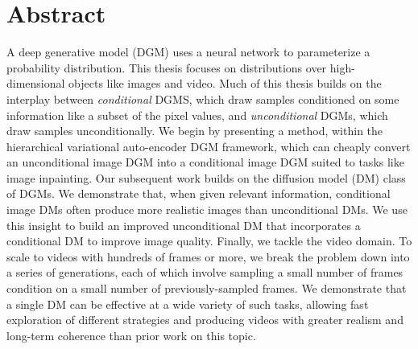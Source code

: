 
\chapter{Abstract}






A deep generative model (DGM) uses a neural network to parameterize a probability distribution. This thesis focuses on distributions over high-dimensional objects like images and video.
%
Much of this thesis builds on the interplay between \textit{conditional} DGMS, which draw samples conditioned on some information like a subset of the pixel values, and \textit{unconditional} DGMs, which draw samples unconditionally.
%
We begin by presenting a method, within the hierarchical variational auto-encoder DGM framework, which can cheaply convert an unconditional image DGM into a conditional image DGM suited to tasks like image inpainting. Our subsequent work builds on the diffusion model (DM) class of DGMs. We demonstrate that, when given relevant information, conditional image DMs often produce more realistic images than unconditional DMs. We use this insight to build an improved unconditional DM that incorporates a conditional DM to improve image quality. Finally, we tackle the video domain. To scale to videos with hundreds of frames or more, we break the problem down into a series of generations, each of which involve sampling a small number of frames condition on a small number of previously-sampled frames. We demonstrate that a single DM can be effective at a wide variety of such tasks, allowing fast exploration of different strategies and producing videos with greater realism and long-term coherence than prior work on this topic.

